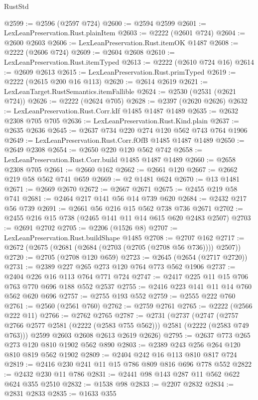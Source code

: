 \begin{lexlean}{RustStd}
\begin{coremodule}
@2599 := @2596 (@2597 @724)
@2600 := @2594 @2599
@2601 := LexLeanPreservation.Rust.plainItem
@2603 := @2222 (@2601 @724)
@2604 := @2600 @2603
@2606 := LexLeanPreservation.Rust.itemOK @1487
@2608 := @2222 (@2606 @724)
@2609 := @2604 @2608
@2610 := LexLeanPreservation.Rust.itemTyped
@2613 := @2222 (@2610 @724 @16)
@2614 := @2609 @2613
@2615 := LexLeanPreservation.Rust.primTyped
@2619 := @2222 (@2615 @200 @16 @113)
@2620 := @2614 @2619
@2621 := LexLeanTarget.RustSemantics.itemFallible
@2624 := @2530 (@2531 (@2621 @724))
@2626 := @2222 (@2624 @705)
@2628 := @2397 (@2620 @2626)
@2632 := LexLeanPreservation.Rust.Corr.kIf @1485 @1487 @1489
@2635 := @2632 @2308 @705 @705
@2636 := LexLeanPreservation.Rust.Kind.plain
@2637 := @2635 @2636
@2645 := @2637 @734 @220 @274 @120 @562 @743 @764 @1906
@2649 := LexLeanPreservation.Rust.Corr.fOfB @1485 @1487 @1489
@2650 := @2649 @2308
@2654 := @2650 @220 @120 @562 @742
@2658 := LexLeanPreservation.Rust.Corr.build @1485 @1487 @1489
@2660 := @2658 @2308 @705
@2661 := @2660 @162
@2662 := @2661 @120
@2667 := @2662 @219 @58 @562 @741 @659
@2669 := @2 @1481 @624
@2670 := @13 @1481
@2671 := @2669 @2670
@2672 := @2667 @2671
@2675 := @2455 @219 @58 @741
@2681 := @2464 @217 @141 @56 @14 @739 @620
@2684 := @2432 @217 @56 @739
@2691 := @2661 @56 @216 @15 @562 @738 @736 @2671
@2702 := @2455 @216 @15 @738 (@2465 @141 @11 @14 @615 @620 @2483 @2507)
@2703 := @2691 @2702
@2705 := @2206 (@1526 @8)
@2707 := LexLeanPreservation.Rust.buildShape @1485
@2708 := @2707 @162
@2717 := @2672 (@2675 (@2681 (@2684 (@2703 (@2705 (@2708 @56 @736)))) @2507))
@2720 := @2705 (@2708 @120 @659)
@2723 := @2645 (@2654 (@2717 @2720))
@2731 := @2389 @227 @265 @273 @120 @764 @773 @562 @1906
@2737 := @2404 @226 @16 @113 @764 @771 @724
@2747 := @2417 @225 @11 @15 @706 @763 @770 @696 @188 @552 @2537
@2755 := @2416 @223 @141 @11 @14 @760 @562 @620 @696
@2757 := @2755 @193 @552
@2759 := @2555 @222 @760
@2761 := @2560 (@2561 @760)
@2762 := @2759 @2761
@2765 := @2222 (@2566 @222 @11)
@2766 := @2762 @2765
@2787 := @2731
    (@2737
      (@2747 (@2757 @2766 @2577 @2581 (@2222 (@2583 @755 @562))) @2581 (@2222 (@2583 @749 @763)))
      @2599
      @2603
      @2608
      @2613
      @2619
      @2626)
@2795 := @2637 @773 @265 @273 @120 @810 @1902 @562 @890
@2803 := @2389 @243 @256 @264 @120 @810 @819 @562 @1902
@2809 := @2404 @242 @16 @113 @810 @817 @724
@2819 := @2416 @230 @241 @11 @15 @786 @809 @816 @696 @778 @552
@2822 := @2432 @230 @11 @786
@2831 := @2441 @98 @143 @287 @11 @562 @622 @624 @355 @2510
@2832 := @1538 @98
@2833 := @2207 @2832
@2834 := @2831 @2833
@2835 := @1633 @355

\end{coremodule}
\end{lexlean}
